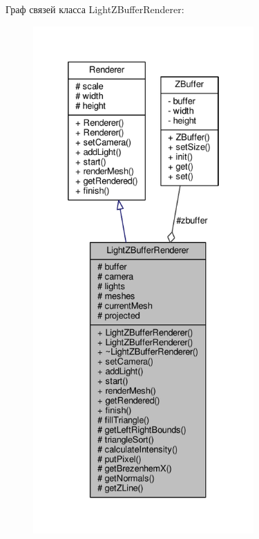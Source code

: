Граф связей класса Light\+Z\+Buffer\+Renderer\+:
\nopagebreak
\begin{figure}[H]
\begin{center}
\leavevmode
\includegraphics[height=550pt]{db/d8f/class_light_z_buffer_renderer__coll__graph}
\end{center}
\end{figure}
